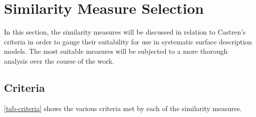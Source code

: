 \documentclass{article}
\begin{document}
\pagebreak
\section{Similarity Measure Selection}
\label{sec-6}

In this section, the similarity measures will be discussed in relation
to Castren's criteria in order to gauge their suitability for use in
systematic surface description models. The most suitable measures will
be subjected to a more thorough analysis over the course of the work.
\subsection{Criteria}
\label{sec-6-1}

\ref{tab-criteria} shows the various criteria met by each of the similarity
measures.
\end{document}
